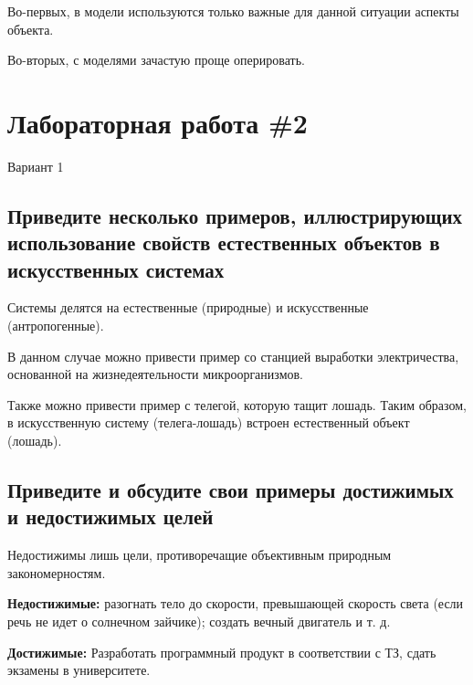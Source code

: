 \documentclass[a4paper,12pt]{article}
\begin{document}
Во-первых, в модели используются только важные для данной ситуации аспекты объекта.

Во-вторых, с моделями зачастую проще оперировать.





\section{Лабораторная работа \#2}

Вариант 1

\subsection{Приведите несколько примеров, иллюстрирующих использование свойств естественных объектов в искусственных системах}

Системы делятся на естественные (природные) и искусственные (антропогенные).

В данном случае можно привести пример со станцией выработки электричества, основанной на жизнедеятельности микроорганизмов.

Также можно привести пример с телегой, которую тащит лошадь. Таким образом, в искусственную систему (телега-лошадь) встроен естественный объект (лошадь).

\subsection{Приведите и обсудите свои примеры достижимых и недостижимых целей}

Недостижимы лишь цели, противоречащие объективным природным закономерностям.

\textbf{Недостижимые:} разогнать тело до скорости, превышающей скорость света (если речь не идет о солнечном зайчике); создать вечный двигатель и т. д.

\textbf{Достижимые:} Разработать программный продукт в соответствии с ТЗ, сдать экзамены в университете.
\end{document}
